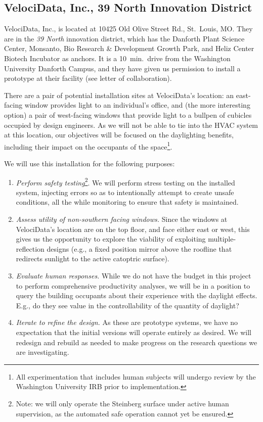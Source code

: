 \subsection{VelociData, Inc., 39 North Innovation District}

VelociData, Inc., is located at 10425 Old Olive Street Rd., St.~Louis, MO.
They are in the \emph{39 North} innovation district, which has the Danforth
Plant Science Center, Monsanto, Bio Research \& Development Growth Park,
and Heliz Center Biotech Incubator as anchors. It is a 10~min.~drive from
the Washington University Danforth Campus, and they have given us
permission to install a prototype at their facility (see letter
of collaboration).

There are a pair of potential installation sites at VelociData's location:
an east-facing window provides light to an individual's office, and
(the more interesting option) a pair of west-facing windows that provide
light to a bullpen of cubicles occupied by design engineers.
As we will not be able to tie into the HVAC system at this location, our
objectives will be focused on the daylighting benefits, including their
impact on the occupants of the space\footnote{All experimentation that
includes human subjects will undergo review by the Washington University
IRB prior to implementation.}.

We will use this installation for the following purposes:

\begin{enumerate}

\item \emph{Perform safety testing}\footnote{Note: we will only operate the Steinberg
surface under active human supervision, as the automated safe operation cannot yet be 
ensured.}.
We will perform stress testing on the installed system, injecting errors so as to
intentionally attempt to create unsafe conditions, all the while monitoring
to ensure that safety is maintained.

\item \emph{Assess utility of non-southern facing windows.}
Since the windows at VelociData's location are on the top floor, and face
either east or west, this gives us the opportunity to explore the viability
of exploiting multiple-reflection designs
(e.g., a fixed position mirror above the
roofline that redirects sunlight to the active catoptric surface).

\item \emph{Evaluate human responses.}
While we do not have the budget in this project to perform
comprehensive productivity analyses, we will be in a position to
query the building occupants about their experience with the
daylight effects. E.g., do they see value in the controllability
of the quantity of daylight?

\item \emph{Iterate to refine the design.}
As these are prototype systems, we have no expectation that the
initial versions will operate entirely as desired.  We will redesign
and rebuild as needed to make progress on the research questions we
are investigating.

\end{enumerate}

